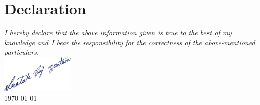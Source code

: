 \vspace{-2em}
\section{Declaration}
\vspace{-.5em}
{\sl I hereby declare that the above information given is true to the best of my knowledge and I bear the responsibility for the correctness of the above-mentioned particulars.}\\
\includegraphics[width=3.5cm]{./includes/sign}\\
\vspace{-6pt}
\today
\vspace{1em}\\
\sectionline
